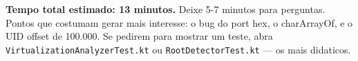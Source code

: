 \documentclass[12pt,a4paper]{article}
\begin{document}
\vspace{0.5cm}

\begin{mdframed}[backgroundcolor=histbg, linecolor=histframe, linewidth=1.5pt,
  innerleftmargin=14pt, innerrightmargin=14pt, innertopmargin=10pt, innerbottommargin=10pt]
\textbf{Tempo total estimado: 13 minutos.}
Deixe 5-7 minutos para perguntas.
Pontos que costumam gerar mais interesse: o bug do port hex,
o charArrayOf, e o UID offset de 100.000.
Se pedirem para mostrar um teste, abra \texttt{VirtualizationAnalyzerTest.kt}
ou \texttt{RootDetectorTest.kt} --- os mais didaticos.
\end{mdframed}
\end{document}
